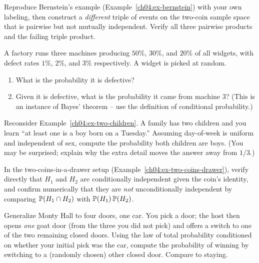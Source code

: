\begin{exercise}
\label{ch04:exer-bernstein}
Reproduce Bernstein's example (Example~\ref{ch04:ex-bernstein}) with your own labeling, then construct a \emph{different} triple of events on the two-coin sample space that is pairwise but not mutually independent. Verify all three pairwise products and the failing triple product.
\end{exercise}

\begin{exercise}
\label{ch04:exer-lotp}
A factory runs three machines producing $50\%$, $30\%$, and $20\%$ of all widgets, with defect rates $1\%$, $2\%$, and $3\%$ respectively. A widget is picked at random.
\begin{enumerate}
\item What is the probability it is defective?
\item Given it is defective, what is the probability it came from machine $3$? (This is an instance of Bayes' theorem -- use the definition of conditional probability.)
\end{enumerate}
\end{exercise}

\begin{exercise}
\label{ch04:exer-two-children}
Reconsider Example~\ref{ch04:ex-two-children}. A family has two children and you learn ``at least one is a boy born on a Tuesday.'' Assuming day-of-week is uniform and independent of sex, compute the probability both children are boys. (You may be surprised; explain why the extra detail moves the answer away from $1/3$.)
\end{exercise}

\begin{exercise}
\label{ch04:exer-cond-indep}
In the two-coins-in-a-drawer setup (Example~\ref{ch04:ex-two-coins-drawer}), verify directly that $H_1$ and $H_2$ are conditionally independent given the coin's identity, and confirm numerically that they are \emph{not} unconditionally independent by comparing $\P(H_1\cap H_2)$ with $\P(H_1)\P(H_2)$.
\end{exercise}

\begin{exercise}
\label{ch04:exer-monty4}
Generalize Monty Hall to four doors, one car. You pick a door; the host then opens \emph{one} goat door (from the three you did not pick) and offers a switch to one of the two remaining closed doors. Using the law of total probability conditioned on whether your initial pick was the car, compute the probability of winning by switching to a (randomly chosen) other closed door. Compare to staying.
\end{exercise}

